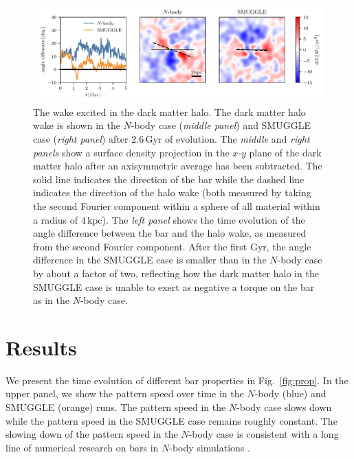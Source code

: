\documentclass[twocolumn,linenumbers,trackchanges]{aastex631}
\newcommand{\Nbody}{$N$-body}
\newcommand{\SMUGGLE}{SMUGGLE}
\begin{document}
\begin{figure}
    \centering
    \includegraphics[width=\textwidth]{fig/halo_wake.pdf}
    \caption{The wake excited in the dark matter halo. The dark matter halo wake
    is shown in the \Nbody{} case (\textit{middle panel}) and \SMUGGLE{} case
    (\textit{right panel}) after $2.6\,\textrm{Gyr}$ of evolution. The
    \textit{middle} and \textit{right panels} show a surface density projection
    in the $x$-$y$ plane of the dark matter halo after an axisymmetric average
    has been subtracted. The solid line indicates the direction of the bar while
    the dashed line indicates the direction of the halo wake (both measured by
    taking the second Fourier component within a sphere of all material within a
    radius of $4\,\textrm{kpc}$). The \textit{left panel} shows the time
    evolution of the angle difference between the bar and the halo wake, as
    measured from the second Fourier component. After the first Gyr, the angle
    difference in the \SMUGGLE{} case is smaller than in the \Nbody{} case by about
    a factor of two, reflecting how the dark matter halo in the \SMUGGLE{} case is
    unable to exert as negative a torque on the bar as in the \Nbody{} case.}
    \label{fig:wake}
\end{figure}

\section{Results}
\label{sec:results}

We present the time evolution of different bar properties in Fig.~\ref{fig:prop}.
In the upper panel, we show the pattern speed over time in the \Nbody{} (blue)
and \SMUGGLE{} (orange) runs. The pattern speed in the \Nbody{} case slows down
while the pattern speed in the \SMUGGLE{} case remains roughly constant. The
slowing down of the pattern speed in the \Nbody{} case is consistent with a long
line of numerical research on bars in \Nbody{} simulations
\citep{1992ApJ...400...80H, 2000ApJ...543..704D, 2002MNRAS.330...35A,
2002ApJ...569L..83A, 2003MNRAS.341.1179A, 2003MNRAS.346..251O,
2005MNRAS.363..991H, 2006ApJ...637..214M, 2007MNRAS.375..460W,
2009ApJ...697..293D}.
\end{document}
